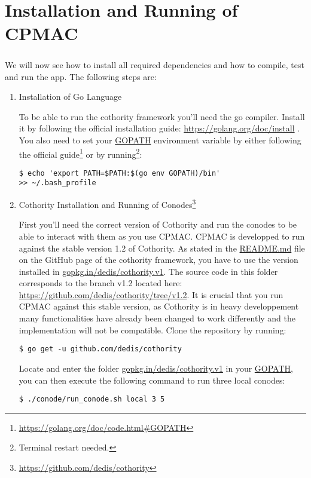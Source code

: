 \chapter{Installation and Running of CPMAC}

\paragraph{}
We will now see how to install all required dependencies and how to compile, test and run the app. The following steps are:

\begin{enumerate}
\item Installation of Go Language

To be able to run the cothority framework you'll need the go compiler. Install it by following the official installation guide: \url{https://golang.org/doc/install} . You also need to set your \url{GOPATH} environment variable by either following the official guide\footnote{\url{https://golang.org/doc/code.html#GOPATH}} or by running\footnote{Terminal restart needed.}:
\begin{lstlisting}
$ echo 'export PATH=$PATH:$(go env GOPATH)/bin'
>> ~/.bash_profile
\end{lstlisting}

\item Cothority Installation and Running of Conodes\footnote{\url{https://github.com/dedis/cothority}}

First you'll need the correct version of Cothority and run the conodes to be able to interact with them as you use CPMAC. CPMAC is developped to run against the stable version 1.2 of Cothority. As stated in the \url{README.md} file on the GitHub page of the cothority framework, you have to use the version installed in \url{gopkg.in/dedis/cothority.v1}. The source code in this folder corresponds to the branch v1.2 located here: \url{https://github.com/dedis/cothority/tree/v1.2}. It is crucial that you run CPMAC against this stable version, as Cothority is in heavy developpement many functionalities have already been changed to work differently and the implementation will not be compatible.
Clone the repository by running:
\begin{lstlisting}
$ go get -u github.com/dedis/cothority
\end{lstlisting}
Locate and enter the folder \url{gopkg.in/dedis/cothority.v1} in your \url{GOPATH}, you can then execute the following command to run three local conodes:
\begin{lstlisting}
$ ./conode/run_conode.sh local 3 5
\end{lstlisting}


\end{enumerate}
